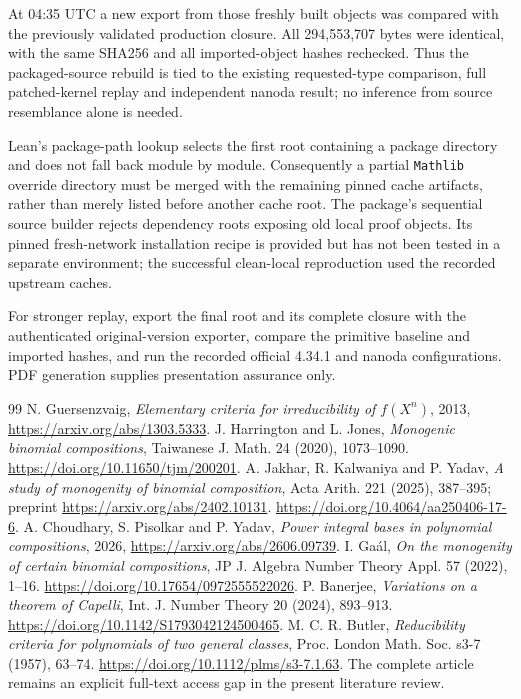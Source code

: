 \documentclass[11pt,letterpaper]{article}
\theoremstyle{remark}\newtheorem{remark}[theorem]{Remark}
\newcommand{\lean}[1]{{\small\urlstyle{tt}\nolinkurl{#1}}}
\begin{document}
At 04:35 UTC a new export from those freshly built objects was compared
with the previously validated production closure. All 294,553,707 bytes
were identical, with the same SHA256 and all imported-object hashes
rechecked. Thus the packaged-source rebuild is tied to the existing
requested-type comparison, full patched-kernel replay and independent
nanoda result; no inference from source resemblance alone is needed.

Lean's package-path lookup selects the first root containing a package
directory and does not fall back module by module. Consequently a partial
\lean{Mathlib} override directory must be merged with the remaining pinned
cache artifacts, rather than merely listed before another cache root.
The package's sequential source builder rejects dependency roots exposing
old local proof objects. Its pinned fresh-network installation recipe is
provided but has not been tested in a separate environment; the successful
clean-local reproduction used the recorded upstream caches.

For stronger replay, export the final root and its complete closure with
the authenticated original-version exporter, compare the primitive
baseline and imported hashes, and run the recorded official 4.34.1 and
nanoda configurations. PDF generation supplies presentation assurance only.

\begin{thebibliography}{99}
N. Guersenzvaig, \emph{Elementary criteria for irreducibility of $f(X^n)$},
2013, \url{https://arxiv.org/abs/1303.5333}.
J. Harrington and L. Jones, \emph{Monogenic binomial compositions},
Taiwanese J. Math. 24 (2020), 1073--1090.
\url{https://doi.org/10.11650/tjm/200201}.
A. Jakhar, R. Kalwaniya and P. Yadav,
\emph{A study of monogenity of binomial composition},
Acta Arith. 221 (2025), 387--395;
preprint \url{https://arxiv.org/abs/2402.10131}.
\url{https://doi.org/10.4064/aa250406-17-6}.
A. Choudhary, S. Pisolkar and P. Yadav,
\emph{Power integral bases in polynomial compositions}, 2026,
\url{https://arxiv.org/abs/2606.09739}.
I. Ga\'al, \emph{On the monogenity of certain binomial compositions},
JP J. Algebra Number Theory Appl. 57 (2022), 1--16.
\url{https://doi.org/10.17654/0972555522026}.
P. Banerjee, \emph{Variations on a theorem of Capelli},
Int. J. Number Theory 20 (2024), 893--913.
\url{https://doi.org/10.1142/S1793042124500465}.
M. C. R. Butler, \emph{Reducibility criteria for polynomials of two general classes},
Proc. London Math. Soc. s3-7 (1957), 63--74.
\url{https://doi.org/10.1112/plms/s3-7.1.63}.
The complete article remains an explicit full-text access gap in the
present literature review.
\end{thebibliography}
\end{document}
